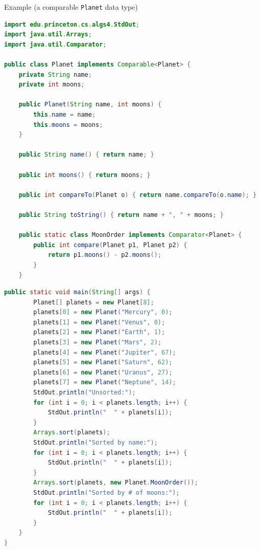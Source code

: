 \documentclass[8pt,a4paper,compress]{beamer}
\begin{document}
\begin{frame}[fragile]
\pause

Example (a comparable \lstinline{Planet} data type)
\begin{lstlisting}[language=Java]
import edu.princeton.cs.algs4.StdOut;
import java.util.Arrays;
import java.util.Comparator;

public class Planet implements Comparable<Planet> {
    private String name;
    private int moons;

    public Planet(String name, int moons) {
        this.name = name;
        this.moons = moons;
    }
    
    public String name() { return name; }

    public int moons() { return moons; }

    public int compareTo(Planet o) { return name.compareTo(o.name); }
    
    public String toString() { return name + ", " + moons; }

    public static class MoonOrder implements Comparator<Planet> {
        public int compare(Planet p1, Planet p2) {
            return p1.moons() - p2.moons();
        }
    }
\end{lstlisting}
\end{frame}

\begin{frame}[fragile]
\pause

\begin{lstlisting}[language=Java]
    public static void main(String[] args) {
        Planet[] planets = new Planet[8];
        planets[0] = new Planet("Mercury", 0);
        planets[1] = new Planet("Venus", 0);
        planets[2] = new Planet("Earth", 1);
        planets[3] = new Planet("Mars", 2);
        planets[4] = new Planet("Jupiter", 67);
        planets[5] = new Planet("Saturn", 62);
        planets[6] = new Planet("Uranus", 27);
        planets[7] = new Planet("Neptune", 14);
        StdOut.println("Unsorted:");
        for (int i = 0; i < planets.length; i++) {
            StdOut.println("  " + planets[i]);
        }
        Arrays.sort(planets);
        StdOut.println("Sorted by name:");
        for (int i = 0; i < planets.length; i++) {
            StdOut.println("  " + planets[i]);
        }
        Arrays.sort(planets, new Planet.MoonOrder());
        StdOut.println("Sorted by # of moons:");
        for (int i = 0; i < planets.length; i++) {
            StdOut.println("  " + planets[i]);
        }
    }
}
\end{lstlisting}
\end{frame}
\end{document}
